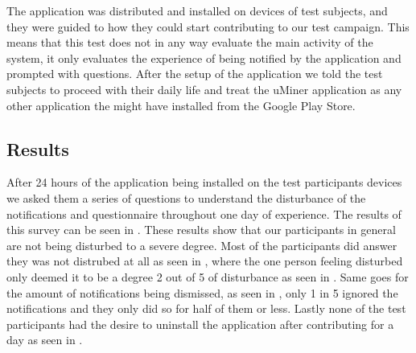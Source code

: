 The application was distributed and installed on devices of test subjects, and they were guided to how they could start contributing to our test campaign. This means that this test does not in any way evaluate the main activity of the system, it only evaluates the experience of being notified by the application and prompted with questions. After the setup of the application we told the test subjects to proceed with their daily life and treat the uMiner application as any other application the might have installed from the Google Play Store. 

\subsection{Results}
\label{sub:results}
After 24 hours of the application being installed on the test participants devices we asked them a series of questions to understand the disturbance of the notifications and questionnaire throughout one day of experience. The results of this survey can be seen in . These results show that our participants in general are not being disturbed to a severe degree. Most of the participants did answer they was not distrubed at all as seen in , where the one person feeling disturbed only deemed it to be a degree 2 out of 5 of disturbance as seen in . Same goes for the amount of notifications being dismissed, as seen in , only 1 in 5 ignored the notifications and they only did so for half of them or less. Lastly none of the test participants had the desire to uninstall the application after contributing for a day as seen in .


